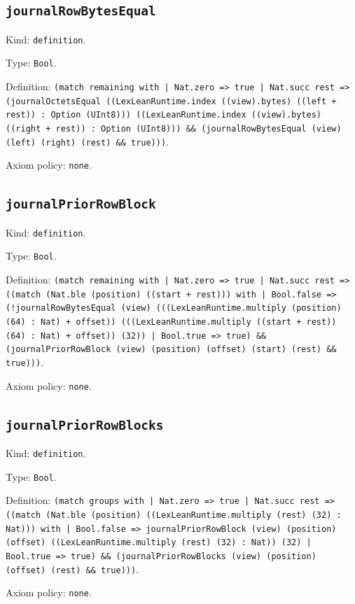 \documentclass[11pt]{article}
\begin{document}
\subsection*{\texttt{journalRowBytesEqual}}
\noindent Kind: \texttt{definition}.\par
\noindent Type: \texttt{Bool}.\par
\noindent Definition: \texttt{(match remaining with | Nat.zero => true | Nat.succ rest => (journalOctetsEqual ((LexLeanRuntime.index ((view).bytes) ((left + rest)) : Option (UInt8))) ((LexLeanRuntime.index ((view).bytes) ((right + rest)) : Option (UInt8))) \&\& (journalRowBytesEqual (view) (left) (right) (rest) \&\& true)))}.\par
\noindent Axiom policy: \texttt{none}.\par
\subsection*{\texttt{journalPriorRowBlock}}
\noindent Kind: \texttt{definition}.\par
\noindent Type: \texttt{Bool}.\par
\noindent Definition: \texttt{(match remaining with | Nat.zero => true | Nat.succ rest => ((match (Nat.ble (position) ((start + rest))) with | Bool.false => (!journalRowBytesEqual (view) (((LexLeanRuntime.multiply (position) (64) : Nat) + offset)) (((LexLeanRuntime.multiply ((start + rest)) (64) : Nat) + offset)) (32)) | Bool.true => true) \&\& (journalPriorRowBlock (view) (position) (offset) (start) (rest) \&\& true)))}.\par
\noindent Axiom policy: \texttt{none}.\par
\subsection*{\texttt{journalPriorRowBlocks}}
\noindent Kind: \texttt{definition}.\par
\noindent Type: \texttt{Bool}.\par
\noindent Definition: \texttt{(match groups with | Nat.zero => true | Nat.succ rest => ((match (Nat.ble (position) ((LexLeanRuntime.multiply (rest) (32) : Nat))) with | Bool.false => journalPriorRowBlock (view) (position) (offset) ((LexLeanRuntime.multiply (rest) (32) : Nat)) (32) | Bool.true => true) \&\& (journalPriorRowBlocks (view) (position) (offset) (rest) \&\& true)))}.\par
\noindent Axiom policy: \texttt{none}.\par
\end{document}
